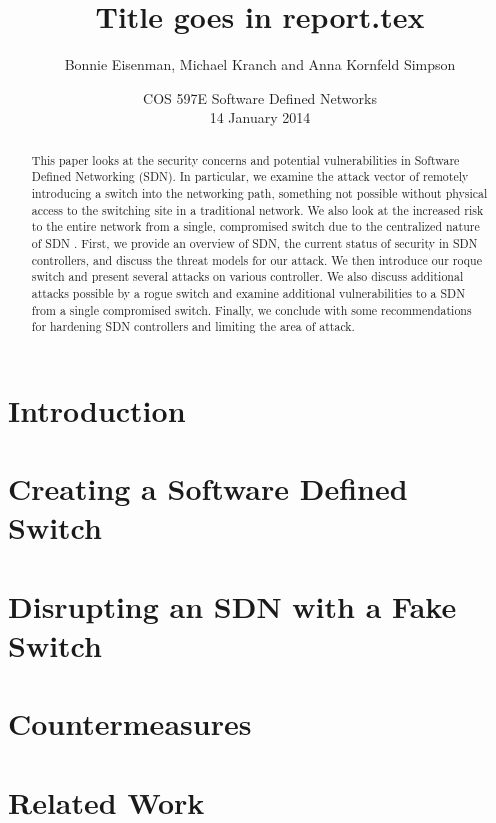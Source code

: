\documentclass[11pt, letterpaper, twocolumn, twoside]{article}
\title{Title goes in report.tex}
\author{Bonnie Eisenman, Michael Kranch and Anna Kornfeld Simpson}
\date{COS 597E Software Defined Networks \\ 14 January 2014}
\begin{document}
\maketitle

\begin{spacing}{1.0}

\begin{abstract}
This paper looks at the security concerns and potential vulnerabilities in Software Defined Networking (SDN). In particular, we examine the attack vector of remotely introducing a switch into the networking path, something not possible without physical access to the switching site in a traditional network. We also look at the increased risk to the entire network from a single, compromised switch due to the centralized nature of SDN . First, we provide an overview of SDN, the current status of security in SDN controllers, and discuss the threat models for our attack. We then introduce our roque switch and present several  attacks on various controller. We also discuss additional attacks possible by a rogue switch and examine additional vulnerabilities to a SDN from a single compromised switch. Finally, we conclude with some recommendations for hardening SDN controllers and limiting the area of attack.
\end{abstract}


\section{Introduction}



\section{Creating a Software Defined Switch}
\label{fake}


\section{Disrupting an SDN with a Fake Switch}
\label{attacks}


\section{Countermeasures}
\label{countermeasures}


\section{Related Work}
\label{related}



\end{spacing}
\end{document}

